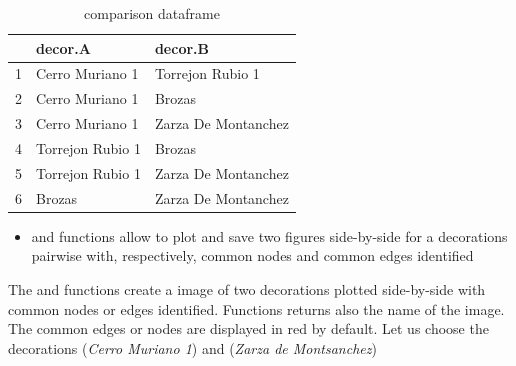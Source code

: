 \documentclass[article]{jss}\usepackage[]{graphicx}\usepackage[]{color}
\begin{document}
\begin{table}[H]
\centering
\begin{tabular}{rll}
  \hline
 & decor.A & decor.B \\ 
  \hline
1 & Cerro Muriano 1 & Torrejon Rubio 1 \\ 
  2 & Cerro Muriano 1 & Brozas \\ 
  3 & Cerro Muriano 1 & Zarza De Montanchez \\ 
  4 & Torrejon Rubio 1 & Brozas \\ 
  5 & Torrejon Rubio 1 & Zarza De Montanchez \\ 
  6 & Brozas & Zarza De Montanchez \\ 
   \hline
\end{tabular}
\caption{comparison dataframe} 
\label{Test_table_1}
\end{table}


\begin{itemize} 
\setlength\itemsep{.1em}
  \item {} and  functions allow to plot and save two figures side-by-side for a decorations pairwise with, respectively, common nodes and common edges identified
\end{itemize}

The and  functions create a  image of two decorations plotted side-by-side with common nodes or edges identified. Functions returns also the name of the image. The common edges or nodes are displayed in red by default. Let us choose the decorations  (\emph{Cerro Muriano 1}) and  (\emph{Zarza de Montsanchez})
\end{document}
